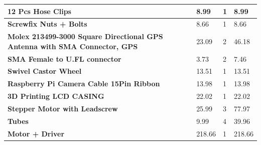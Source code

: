 \documentclass[11pt,landscape]{article}
\begin{document}
\begin{table}[H]
\begin{center}
\begin{tabular}{|l|l|l|l|}
    \textbf{12 Pcs Hose Clips}                                                                 & 8.99                                          & 1                                     & 8.99                                                  \\ \hline
    \textbf{Screwfix Nuts + Bolts}                                                             & 8.66                                          & 1                                     & 8.66                                                  \\ \hline
    \textbf{Molex 213499-3000 Square Directional GPS Antenna with SMA Connector, GPS} & 23.09                                         & 2                                     & 46.18                                                 \\ \hline
    \textbf{SMA Female to U.FL connector}                                             & 3.73                                          & 2                                     & 7.46                                                  \\ \hline
    \textbf{Swivel Castor Wheel}                                                      & 13.51                                         & 1                                     & 13.51                                                 \\ \hline
    \textbf{Raspberry Pi Camera Cable 15Pin Ribbon}                                   & 13.98                                         & 1                                     & 13.98                                                 \\ \hline
    \textbf{3D Printing LCD CASING}                                                   & 22.02                                         & 1                                     & 22.02                                                 \\ \hline
    \textbf{Stepper Motor with Leadscrew}                                             & 25.99                                         & 3                                     & 77.97                                                 \\ \hline
    \textbf{Tubes}                                                                    & 9.99                                          & 4                                     & 39.96                                                 \\ \hline
    \textbf{Motor + Driver}                                                           & 218.66                                        & 1                                     & 218.66                                                \\ \hline

\end{tabular}
\end{center}
\end{table}
\end{document}
